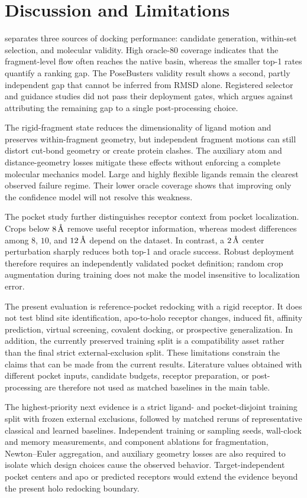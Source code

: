 \section{Discussion and Limitations}
\label{sec:discussion}

\method separates three sources of docking performance: candidate generation,
within-set selection, and molecular validity. High oracle-80 coverage indicates
that the fragment-level flow often reaches the native basin, whereas the
smaller top-1 rates quantify a ranking gap. The PoseBusters validity result
shows a second, partly independent gap that cannot be inferred from RMSD alone.
Registered selector and guidance studies did not pass their deployment gates,
which argues against attributing the remaining gap to a single post-processing
choice.

The rigid-fragment state reduces the dimensionality of ligand motion and
preserves within-fragment geometry, but independent fragment motions can still
distort cut-bond geometry or create protein clashes. The auxiliary atom and
distance-geometry losses mitigate these effects without enforcing a complete
molecular mechanics model. Large and highly flexible ligands remain the
clearest observed failure regime. Their lower oracle coverage shows that
improving only the confidence model will not resolve this weakness.

The pocket study further distinguishes receptor context from pocket
localization. Crops below \(8\,\text{\normalfont\AA}\) remove useful receptor information,
whereas modest differences among \(8\), \(10\), and \(12\,\text{\normalfont\AA}\) depend
on the dataset. In contrast, a \(2\,\text{\normalfont\AA}\) center perturbation sharply
reduces both top-1 and oracle success. Robust deployment therefore requires an
independently validated pocket definition; random crop augmentation during
training does not make the model insensitive to localization error.

The present evaluation is reference-pocket redocking with a rigid receptor.
It does not test blind site identification, apo-to-holo receptor changes,
induced fit, affinity prediction, virtual screening, covalent docking, or
prospective generalization. In addition, the currently preserved training
split is a compatibility asset rather than the final strict external-exclusion
split. These limitations constrain the claims that can be made from the
current results. Literature values obtained with different pocket inputs,
candidate budgets, receptor preparation, or post-processing are therefore not
used as matched baselines in the main table.

The highest-priority next evidence is a strict ligand- and pocket-disjoint
training split with frozen external exclusions, followed by matched reruns of
representative classical and learned baselines. Independent training or
sampling seeds, wall-clock and memory measurements, and component ablations
for fragmentation, Newton--Euler aggregation, and auxiliary geometry losses
are also required to isolate which design choices cause the observed behavior.
Target-independent pocket centers and apo or predicted receptors would extend
the evidence beyond the present holo redocking boundary.
